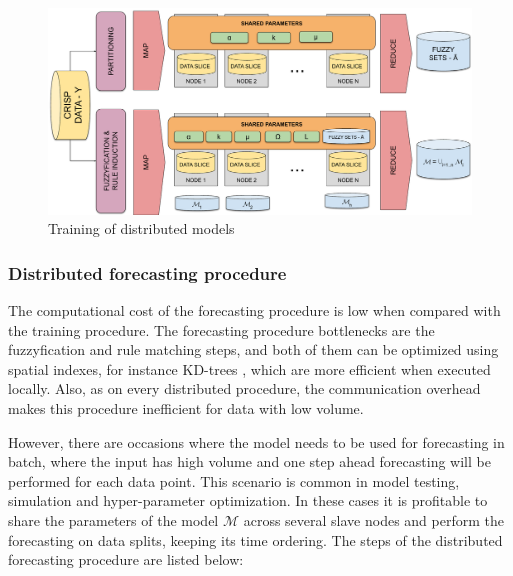 \begin{figure}[htb]
    \centering
    \includegraphics[width=\textwidth]{figures/distributed_models_training.pdf}
    \caption{Training of distributed models}
    \label{fig:distributed_models_training}
\end{figure}

\subsubsection{Distributed forecasting procedure}
\label{sec:distributed_forecasting}

The computational cost of the forecasting procedure is low when compared with the training procedure. The forecasting procedure bottlenecks are the fuzzyfication and rule matching steps, and both of them can be optimized using spatial indexes, for instance KD-trees \citep{Muja2014}, which are more efficient when executed locally. Also, as on every distributed procedure, the communication overhead makes this procedure inefficient for data with low volume.

However, there are occasions where the model needs to be used for forecasting in batch, where the input has high volume and one step ahead forecasting will be performed for each data point. This scenario is common in model testing, simulation and hyper-parameter optimization. In these cases it is profitable to share the parameters of the model $\mathcal{M}$ across several slave nodes and perform the forecasting on data splits, keeping its time ordering. The steps of the distributed forecasting procedure are listed below:

